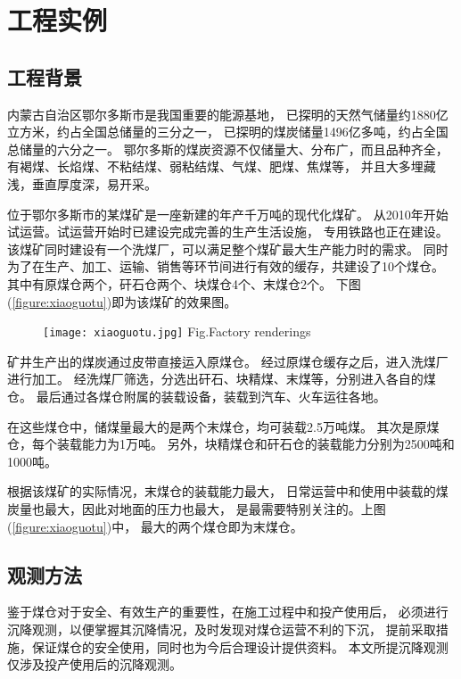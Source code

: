 ﻿%

\chapter{工程实例}

\label{chap04}

\section{工程背景} 
内蒙古自治区鄂尔多斯市是我国重要的能源基地，
已探明的天然气储量约1880亿立方米，约占全国总储量的三分之一，
已探明的煤炭储量1496亿多吨，约占全国总储量的六分之一。
鄂尔多斯的煤炭资源不仅储量大、分布广，而且品种齐全，
有褐煤、长焰煤、不粘结煤、弱粘结煤、气煤、肥煤、焦煤等，
并且大多埋藏浅，垂直厚度深，易开采。

位于鄂尔多斯市的某煤矿是一座新建的年产千万吨的现代化煤矿。
从2010年开始试运营。试运营开始时已建设完成完善的生产生活设施，
专用铁路也正在建设。
该煤矿同时建设有一个洗煤厂，可以满足整个煤矿最大生产能力时的需求。
同时为了在生产、加工、运输、销售等环节间进行有效的缓存，共建设了10个煤仓。
其中有原煤仓两个，矸石仓两个、块煤仓4个、末煤仓2个。
下图(\ref{figure:xiaoguotu})即为该煤矿的效果图。
\begin{figure}[!htbp]
   \centering
   \texttt{[image: xiaoguotu.jpg]}
								{Fig.}{Factory renderings}
\end{figure}

矿井生产出的煤炭通过皮带直接运入原煤仓。
经过原煤仓缓存之后，进入洗煤厂进行加工。
经洗煤厂筛选，分选出矸石、块精煤、末煤等，分别进入各自的煤仓。
最后通过各煤仓附属的装载设备，装载到汽车、火车运往各地。

在这些煤仓中，储煤量最大的是两个末煤仓，均可装载2.5万吨煤。
其次是原煤仓，每个装载能力为1万吨。
另外，块精煤仓和矸石仓的装载能力分别为2500吨和1000吨。

根据该煤矿的实际情况，末煤仓的装载能力最大，
日常运营中和使用中装载的煤炭量也最大，因此对地面的压力也最大，
是最需要特别关注的。上图(\ref{figure:xiaoguotu})中，
最大的两个煤仓即为末煤仓。

\section{观测方法}
鉴于煤仓对于安全、有效生产的重要性，在施工过程中和投产使用后，
必须进行沉降观测，以便掌握其沉降情况，及时发现对煤仓运营不利的下沉，
提前采取措施，保证煤仓的安全使用，同时也为今后合理设计提供资料。
本文所提沉降观测仅涉及投产使用后的沉降观测。

